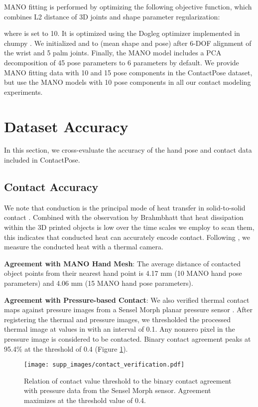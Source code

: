 \documentclass[runningheads]{llncs}
\begin{document}
MANO fitting is performed by optimizing the following objective function, which combines L2 distance of 3D joints and shape parameter regularization:



where  is set to 10. It is optimized using the Dogleg \cite{powell1970new} optimizer implemented in chumpy \cite{chumpy}. We initialized  and  to  (mean shape and pose) after 6-DOF alignment of the wrist and 5 palm joints. Finally, the MANO model includes a PCA decomposition of 45 pose parameters to 6 parameters by default. We provide MANO fitting data with 10 and 15 pose components in the ContactPose dataset, but use the MANO models with 10 pose components in all our contact modeling experiments.

\section{Dataset Accuracy}
In this section, we cross-evaluate the accuracy of the hand pose and contact data included in ContactPose.

\subsection{Contact Accuracy}
We note that conduction is the principal mode of heat transfer in solid-to-solid contact \cite{ahtt5e}. Combined with the observation by Brahmbhatt \etal \cite{contactdbv1} that heat dissipation within the 3D printed objects is low over the time scales we employ to scan them, this indicates that conducted heat can accurately encode contact. Following \cite{contactdbv1}, we measure the conducted heat with a thermal camera.

\noindent\textbf{Agreement with MANO Hand Mesh}: The average distance of contacted object points from their nearest hand point is 4.17 mm (10 MANO hand pose parameters) and 4.06 mm (15 MANO hand pose parameters).

\noindent\textbf{Agreement with Pressure-based Contact}: We also verified thermal contact maps against pressure images from a Sensel Morph planar pressure sensor \cite{sensel_morph_website, sensel_morph_patent}. After registering the thermal and pressure images, we thresholded the processed thermal image at values in  with an interval of 0.1. Any nonzero pixel in the pressure image is considered to be contacted. Binary contact agreement peaks at 95.4\% at the threshold of 0.4 (Figure \ref{fig:contact_verification}).

\begin{figure}
  \texttt{[image: supp\_images/contact\_verification.pdf]}
  \caption{Relation of contact value threshold to the binary contact agreement with pressure data from the Sensel Morph sensor. Agreement maximizes at the
  threshold value of 0.4.}
  \label{fig:contact_verification}
\end{figure}
\end{document}
